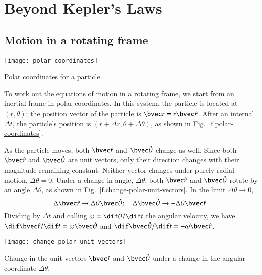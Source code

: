 \chapter{Beyond Kepler's Laws}

\section{Motion in a rotating frame}

\begin{marginfigure}
\texttt{[image: polar-coordinates]}
\caption[Polar coordinates]{Polar coordinates for a particle.
\label{f.polar-coordinates}}
\end{marginfigure}
To work out the equations of motion in a rotating frame, we start from an inertial frame in polar coordinates.  In this system, the particle is located at $(r,\theta)$; the position vector of the particle is $\rv = r\rhat$. After an internal $\Delta t$, the particle's position is $(r+\Delta r,\theta+\Delta\theta)$, as shown in Fig.~\ref{f.polar-coordinates}.  

As the particle moves, both $\rhat$ and $\thetahat$ change as well.  Since both $\rhat$ and $\thetahat$ are unit vectors, only their direction changes with their magnitude remaining constant. Neither vector changes under purely radial motion, $\Delta\theta = 0$.  Under a change in angle, $\Delta\theta$, both $\rhat$ and $\thetahat$ rotate by an angle $\Delta\theta$, as shown in Fig.~\ref{f.change-polar-unit-vectors}. In the limit $\Delta\theta \to 0$, 
\[ \Delta \rhat \to \Delta\theta \thetahat; \quad \Delta\thetahat \to -\Delta\theta\rhat. \]
Dividing by $\Delta t$ and calling $\omega = \dif\theta/\dif t$ the angular velocity, we have
$\dif\rhat/\dif t = \omega\thetahat$ and $\dif\thetahat/\dif t = -\omega\rhat$.

\begin{marginfigure}
\texttt{[image: change-polar-unit-vectors]}
\caption[Change in unit vectors under rotation]{Change in the unit vectors $\rhat$ and $\thetahat$ under a change in the angular coordinate $\Delta\theta$.
\label{f.change-polar-unit-vectors}}
\end{marginfigure}

